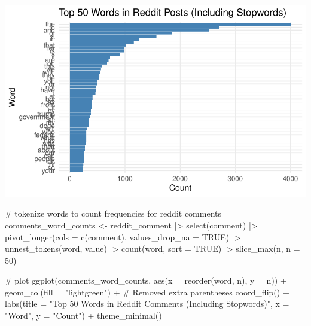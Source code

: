 \documentclass[
  letterpaper,
  DIV=11,
  numbers=noendperiod]{scrartcl}
\newenvironment{Shaded}{\begin{snugshade}}{\end{snugshade}}
\newcommand{\AttributeTok}[1]{\textcolor[rgb]{0.40,0.45,0.13}{#1}}
\newcommand{\CommentTok}[1]{\textcolor[rgb]{0.37,0.37,0.37}{#1}}
\newcommand{\ConstantTok}[1]{\textcolor[rgb]{0.56,0.35,0.01}{#1}}
\newcommand{\DecValTok}[1]{\textcolor[rgb]{0.68,0.00,0.00}{#1}}
\newcommand{\FunctionTok}[1]{\textcolor[rgb]{0.28,0.35,0.67}{#1}}
\newcommand{\NormalTok}[1]{\textcolor[rgb]{0.00,0.23,0.31}{#1}}
\newcommand{\OtherTok}[1]{\textcolor[rgb]{0.00,0.23,0.31}{#1}}
\newcommand{\SpecialCharTok}[1]{\textcolor[rgb]{0.37,0.37,0.37}{#1}}
\newcommand{\StringTok}[1]{\textcolor[rgb]{0.13,0.47,0.30}{#1}}
\begin{document}
\includegraphics{Reddit_eda_files/figure-pdf/unnamed-chunk-7-1.pdf}

\begin{Shaded}
\begin{Highlighting}[]
\CommentTok{\# tokenize words to count frequencies for reddit comments}
\NormalTok{comments\_word\_counts }\OtherTok{\textless{}{-}}\NormalTok{ reddit\_comment }\SpecialCharTok{|\textgreater{}}
  \FunctionTok{select}\NormalTok{(comment) }\SpecialCharTok{|\textgreater{}}
  \FunctionTok{pivot\_longer}\NormalTok{(}\AttributeTok{cols =} \FunctionTok{c}\NormalTok{(comment), }\AttributeTok{values\_drop\_na =} \ConstantTok{TRUE}\NormalTok{) }\SpecialCharTok{|\textgreater{}}
  \FunctionTok{unnest\_tokens}\NormalTok{(word, value) }\SpecialCharTok{|\textgreater{}}
  \FunctionTok{count}\NormalTok{(word, }\AttributeTok{sort =} \ConstantTok{TRUE}\NormalTok{) }\SpecialCharTok{|\textgreater{}}
  \FunctionTok{slice\_max}\NormalTok{(n, }\AttributeTok{n =} \DecValTok{50}\NormalTok{)}

\CommentTok{\# plot}
\FunctionTok{ggplot}\NormalTok{(comments\_word\_counts, }\FunctionTok{aes}\NormalTok{(}\AttributeTok{x =} \FunctionTok{reorder}\NormalTok{(word, n), }\AttributeTok{y =}\NormalTok{ n)) }\SpecialCharTok{+}
  \FunctionTok{geom\_col}\NormalTok{(}\AttributeTok{fill =} \StringTok{"lightgreen"}\NormalTok{) }\SpecialCharTok{+}  \CommentTok{\# Removed extra parentheses}
  \FunctionTok{coord\_flip}\NormalTok{() }\SpecialCharTok{+}
  \FunctionTok{labs}\NormalTok{(}\AttributeTok{title =} \StringTok{"Top 50 Words in Reddit Comments (Including Stopwords)"}\NormalTok{,}
       \AttributeTok{x =} \StringTok{"Word"}\NormalTok{,}
       \AttributeTok{y =} \StringTok{"Count"}\NormalTok{) }\SpecialCharTok{+}
  \FunctionTok{theme\_minimal}\NormalTok{()}
\end{Highlighting}
\end{Shaded}
\end{document}
